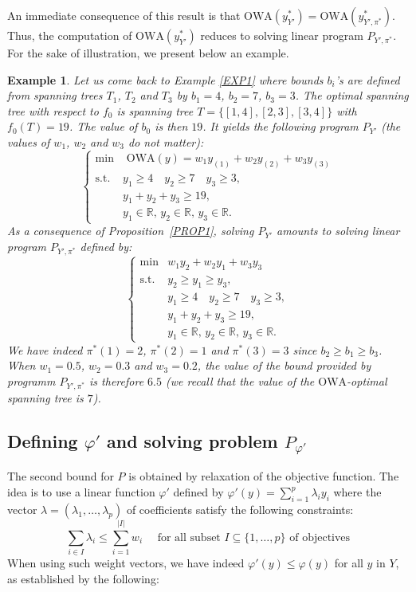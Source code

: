 \documentclass[final,3p,times]{elsarticle}
\newcommand{\owa}{\mbox{OWA}}
\newtheorem{example}{Example}
\begin{document}
An immediate consequence of this result is that $\owa(y^*_{Y'}) =
\owa(y^*_{Y',\pi^*})$. Thus, the computation of $\owa(y^*_{Y'})$ 
reduces to solving linear program $P_{Y',\pi^*}$. For the sake of illustration, we present below an example.

\begin{example}
Let us come back to Example \ref{EXP1} where bounds $b_i$'s are defined from spanning trees $T_1$, $T_2$ and $T_3$ by $b_1=4$, $b_2=7$, $b_3=3$. The optimal spanning tree with respect to $f_0$ is spanning tree $T=\{[1,4],[2,3],[3,4]\}$ with $f_0(T) = 19$. The value of $b_0$ is then $19$.
It yields the following program $P_{Y'}$ (the values of $w_1$, $w_2$ and $w_3$ do not matter):
$$
\left\{
\begin{array}{ll}
\min & \mbox{ OWA}(y) = w_1 y_{(1)} + w_2 y_{(2)} + w_3 y_{(3)} \\
\mbox{s.t.} & y_1 \geq 4 \quad y_2 \geq 7 \quad y_3 \geq 3, \\
& y_1 + y_2 + y_3 \geq 19, \\
& y_1 \in {\mathbb R},\,y_2 \in {\mathbb R},\,y_3 \in {\mathbb R}.
\end{array}
\right.
$$
As a consequence of Proposition~\ref{PROP1}, solving $P_{Y'}$ amounts to solving linear program $P_{Y',\pi^*}$ defined by:
$$
\left\{
\begin{array}{ll}
\min & w_1 y_2 + w_2 y_1 + w_3 y_3 \\
\mbox{s.t.} & y_{2} \geq y_{1} \geq y_{3}, \\
& y_1 \geq 4 \quad y_2 \geq 7 \quad y_3 \geq 3, \\
& y_1 + y_2 + y_3 \geq 19, \\
& y_1 \in {\mathbb R},\,y_2 \in {\mathbb R},\,y_3 \in {\mathbb R}.
\end{array}
\right.
$$
We have indeed $\pi^*(1) = 2$, $\pi^*(2) = 1$ and $\pi^*(3) = 3$ since $b_2 \geq b_1 \geq b_3$. 
When $w_1 = 0.5$, $w_2=0.3$ and $w_3=0.2$, the value of the bound provided by programm $P_{Y',\pi^*}$ is therefore $6.5$ (we recall that the value of the $\owa$-optimal spanning tree is $7$).
\end{example}

\subsection{Defining $\varphi'$ and solving problem $P_{\varphi'}$}
\label{PPHI'}

The second bound for $P$ is obtained by relaxation of the objective function. The idea is to use a linear function $\varphi'$ defined by $\varphi'(y)=\sum_{i=1}^p \lambda_i y_i$ where the vector $\lambda=(\lambda_1,\ldots,\lambda_p)$ of coefficients satisfy the following constraints:
\begin{equation} \label{EQ1}
\sum_{i \in I} \lambda_i \leq \sum_{i=1}^{\vert I \vert} w_i \quad \mbox{ for all subset } I \subseteq \{1,\ldots,p\}  \mbox{ of objectives}
\end{equation}
When using such weight vectors, we have indeed $\varphi'(y) \leq \varphi(y)$ for all $y$ in $Y$, as established by the following: 
\end{document}

